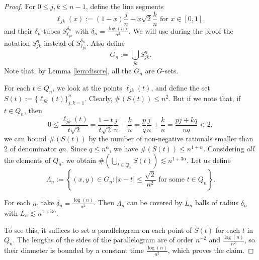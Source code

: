 \documentclass[11pt,a4paper]{amsart}
\begin{document}
\begin{proof}
For $0\le j,k\le n-1$, define the line segments
\[
\ell_{jk}(x):=(1-x)\frac{j}{n}+x\sqrt{2}\frac{k}{n} \text{ for }
x\in[0,1],
\]
and their $\delta_n$-tubes $S_{\ell_{jk}}^{\delta_n}$ with
$\delta_n=\frac{\log(n)}{n^2}$. We will use during the proof the
notation $S_{jk}^n$ instead of $S_{\ell_{jk}}^{\delta_n}$. Also
define
\begin{equation}\label{eq:Gn}
G_n:=\bigcup_{jk}S_{jk}^n.
\end{equation}
Note that, by Lemma \ref{lem:discre}, all the $G_n$ are $G$-sets. 

For each $t\in Q_n$, we look at the points $\ell_{jk}(t)$, and 
define the set $S(t):=\{\ell_{jk}(t)\}_{j,k=1}^n$. Clearly, $\#(S(t))\le
n^2$. But if we note that, if $t\in Q_n$, then
\begin{equation*}
0\le\frac{\ell_{jk}(t)}{t\sqrt{2}}=\frac{1-t}{t\sqrt{2}}\frac{j}{n}+\frac{k}{n}=\frac{p}{q}\frac{j}{n}+\frac{k}{n}=\frac{pj+kq}{nq}<2,
\end{equation*}
we can bound $\#(S(t))$ by the number of non-negative rationals
smaller than 2 of denominator $qn$. Since $q\le n^\alpha$, we
have $\#(S(t))\le n^{1+\alpha}$. Considering \emph{all} the
elements of $Q_n$, we obtain $\#\left(\bigcup_{t\in
Q_n}S(t)\right)\lesssim n^{1+3\alpha}$. Let us define
\begin{equation*}
\Lambda_n:=\left\{(x,y)\in G_n: |x-t|\le \frac{\sqrt{2}}{n^2}\text{ for
some } t\in Q_n\right\}.
\end{equation*}

\begin{claim}
 For each $n$, take $\delta_n=\frac{\log(n)}{n^2}$. Then $\Lambda_n$ can be covered by $L_n$ balls of radius $\delta_n$ with $L_n \lesssim n^{1+3\alpha}$.
\end{claim}
To see this, it suffices to set a parallelogram on each point of
$S(t)$ for each $t$ in $Q_n$. The lengths of the sides of the
parallelogram are of order $n^{-2}$ and $\frac{\log(n)}{n^2}$, so
their diameter is bounded by  a constant time
$\frac{\log(n)}{n^2}$, which proves the claim.


\end{proof}
\end{document}
